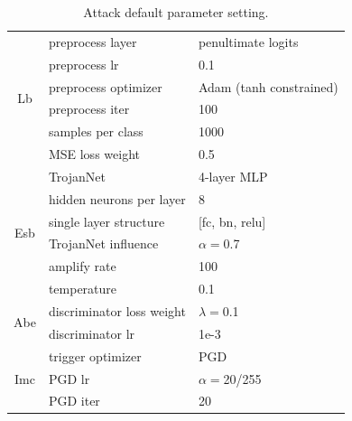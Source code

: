 \documentclass[compsoc,conference,a4paper,10pt,times]{IEEEtran}
\newcommand{\lb}{{\sc Lb}\xspace}
\newcommand{\esb}{{\sc Esb}\xspace}
\newcommand{\abe}{{\sc Abe}\xspace}
\newcommand{\imc}{{\sc Imc}\xspace}
\begin{document}
\begin{table}[!ht]
{\begin{tabular}{c|l|l}
            \multirow{6}{*}{\lb}      & preprocess layer          & penultimate logits       \\ %
                                      & preprocess lr             & 0.1                     \\
                                      & preprocess optimizer      & Adam (tanh constrained) \\
                                      & preprocess iter           & 100                     \\
                                      & samples per class         & 1000                    \\
                                      & MSE loss weight           & 0.5                     \\
            \hline

            \multirow{6}{*}{\esb}     & TrojanNet                 & 4-layer MLP             \\
                                      & hidden neurons per layer  & 8                       \\
                                      & single layer structure    & [fc, bn, relu]          \\
                                      & TrojanNet influence       & $\alpha=$0.7            \\
                                      & amplify rate              & 100                     \\
                                      & temperature               & 0.1                     \\
            \hline

            \multirow{2}{*}{\abe}     & discriminator loss weight & $\lambda=$0.1           \\
                                      & discriminator lr          & 1e-3                    \\
            \hline

            \multirow{3}{*}{\imc}     & trigger optimizer         & PGD                     \\
                                      & PGD lr                    & $\alpha=$20/255         \\
                                      & PGD iter                  & 20                      \\
        \end{tabular}
        \caption{Attack default parameter setting. \label{tab:attack_param}}}
\end{table}
\end{document}
